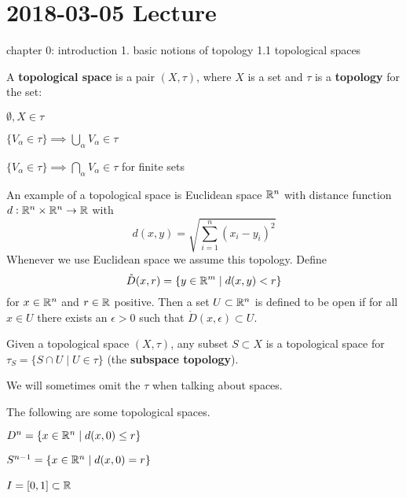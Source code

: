 \section{2018-03-05 Lecture}

chapter 0: introduction
1. basic notions of topology
1.1 topological spaces

\begin{defn}
	A \textbf{topological space} is a pair $(X,\tau)$, where $X$ is a set and $\tau$ is a \textbf{topology} for the set:
	\begin{itm}
		\item $\emptyset, X \in \tau$
		\item $\{V_\alpha \in \tau\} \implies \bigcup_\alpha V_\alpha \in \tau$
		\item $\{V_\alpha \in \tau\} \implies \bigcap_\alpha V_\alpha \in \tau$ for finite sets
	\end{itm}
\end{defn}

\begin{exam}
	An example of a topological space is Euclidean space $\mathbb{R}^n$ with distance function $d: \mathbb{R}^n \times \mathbb{R}^n \to \mathbb{R}$ with
	\[d(x,y) = \sqrt{\sum_{i=1}^n(x_i-y_i)^2}\]
	\[\]
	Whenever we use Euclidean space we assume this topology.
	Define
	\[\mathring{D}(x,r) = \{y \in \mathbb{R}^m \mid d(x,y)<r\}\]
	for $x \in \mathbb{R}^n$ and $r \in \mathbb{R}$ positive.
	Then a set $U \subset \mathbb{R}^n$ is defined to be open if for all $x \in U$ there exists an $\epsilon>0$ such that $\mathring{D}(x,\epsilon) \subset U$.
\end{exam}

\begin{defn}
	Given a topological space $(X,\tau)$, any subset $S \subset X$ is a topological space for $\tau_S = \{S \cap U \mid U \in \tau\}$ (the \textbf{subspace topology}).
\end{defn}

We will sometimes omit the $\tau$ when talking about spaces.

\begin{exam}
	The following are some topological spaces.
	\begin{itm}
		\item $D^n = \{x \in \mathbb{R}^n \mid d(x,0) \leq r\}$
		\item $S^{n-1} = \{x \in \mathbb{R}^n \mid d(x,0) = r\}$
		\item $I = [0,1] \subset \mathbb{R}$\
	\end{itm}
\end{exam}

